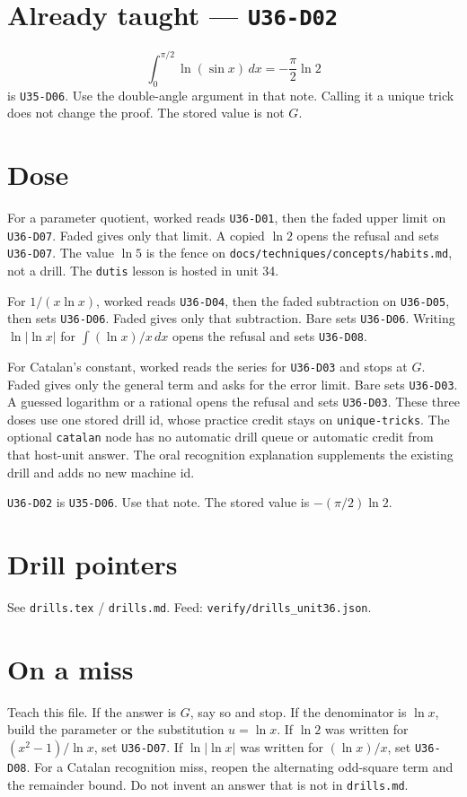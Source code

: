 \section{Already taught --- \texttt{U36-D02}}
\[
\int_0^{\pi/2}\ln(\sin x)\,dx=-\frac\pi2\ln 2
\]
is \texttt{U35-D06}. Use the double-angle argument in that note. Calling it a unique trick does not change the proof. The stored value is not $G$.

\section{Dose}
For a parameter quotient, worked reads \texttt{U36-D01}, then the faded upper limit on \texttt{U36-D07}. Faded gives only that limit. A copied $\ln 2$ opens the refusal and sets \texttt{U36-D07}. The value $\ln 5$ is the fence on \texttt{docs/techniques/concepts/habits.md}, not a drill. The \texttt{dutis} lesson is hosted in unit 34.

For $1/(x\ln x)$, worked reads \texttt{U36-D04}, then the faded subtraction on \texttt{U36-D05}, then sets \texttt{U36-D06}. Faded gives only that subtraction. Bare sets \texttt{U36-D06}. Writing $\ln|\ln x|$ for $\int(\ln x)/x\,dx$ opens the refusal and sets \texttt{U36-D08}.

For Catalan's constant, worked reads the series for \texttt{U36-D03} and stops at $G$. Faded gives only the general term and asks for the error limit. Bare sets \texttt{U36-D03}. A guessed logarithm or a rational opens the refusal and sets \texttt{U36-D03}. These three doses use one stored drill id, whose practice credit stays on \texttt{unique-tricks}. The optional \texttt{catalan} node has no automatic drill queue or automatic credit from that host-unit answer. The oral recognition explanation supplements the existing drill and adds no new machine id.

\texttt{U36-D02} is \texttt{U35-D06}. Use that note. The stored value is $-(\pi/2)\ln 2$.

\section{Drill pointers}
See \texttt{drills.tex} / \texttt{drills.md}. Feed: \texttt{verify/drills\_unit36.json}.

\section*{On a miss}
Teach this file. If the answer is $G$, say so and stop. If the denominator is $\ln x$, build the parameter or the substitution $u=\ln x$. If $\ln 2$ was written for $(x^2-1)/\ln x$, set \texttt{U36-D07}. If $\ln|\ln x|$ was written for $(\ln x)/x$, set \texttt{U36-D08}. For a Catalan recognition miss, reopen the alternating odd-square term and the remainder bound. Do not invent an answer that is not in \texttt{drills.md}.

